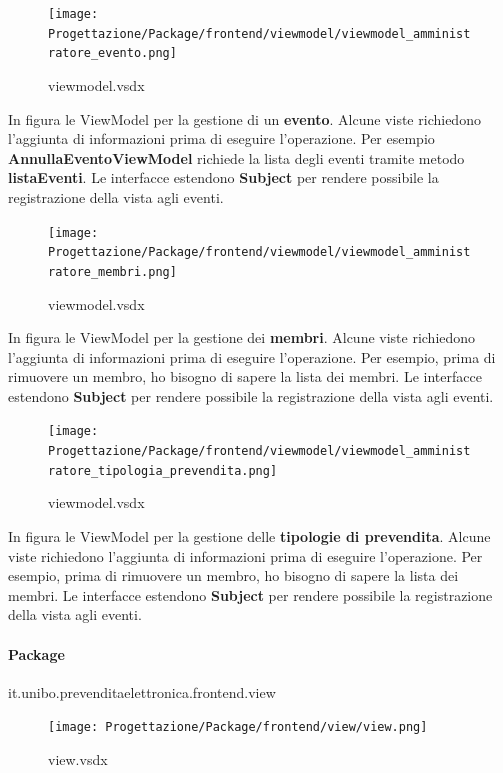 \documentclass[a4paper]{article}
\begin{document}
\begin{figure}[H]
    \texttt{[image: Progettazione/Package/frontend/viewmodel/viewmodel\_amministratore\_evento.png]}
    \centering
    \caption{viewmodel.vsdx}
\end{figure}

In figura le ViewModel per la gestione di un \textbf{evento}. Alcune viste richiedono l'aggiunta di informazioni prima di eseguire l'operazione. Per esempio \textbf{AnnullaEventoViewModel} richiede la lista degli eventi tramite metodo \textbf{listaEventi}. Le interfacce estendono \textbf{Subject} per rendere possibile la registrazione della vista agli eventi.

\begin{figure}[H]
    \texttt{[image: Progettazione/Package/frontend/viewmodel/viewmodel\_amministratore\_membri.png]}
    \centering
    \caption{viewmodel.vsdx}
\end{figure}

In figura le ViewModel per la gestione dei \textbf{membri}. Alcune viste richiedono l'aggiunta di informazioni prima di eseguire l'operazione. Per esempio, prima di rimuovere un membro, ho bisogno di sapere la lista dei membri. Le interfacce estendono \textbf{Subject} per rendere possibile la registrazione della vista agli eventi.

\begin{figure}[H]
    \texttt{[image: Progettazione/Package/frontend/viewmodel/viewmodel\_amministratore\_tipologia\_prevendita.png]}
    \centering
    \caption{viewmodel.vsdx}
\end{figure}

In figura le ViewModel per la gestione delle \textbf{tipologie di prevendita}. Alcune viste richiedono l'aggiunta di informazioni prima di eseguire l'operazione. Per esempio, prima di rimuovere un membro, ho bisogno di sapere la lista dei membri. Le interfacce estendono \textbf{Subject} per rendere possibile la registrazione della vista agli eventi.

\paragraph{Package} it.unibo.prevenditaelettronica.frontend.view

\begin{figure}[H]
    \texttt{[image: Progettazione/Package/frontend/view/view.png]}
    \centering
    \caption{view.vsdx}
\end{figure}
\end{document}
